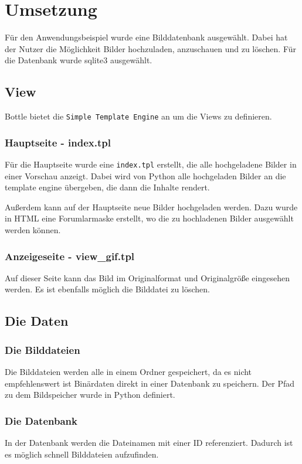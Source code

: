\section{Umsetzung}
Für den Anwendungsbeispiel wurde eine Bilddatenbank ausgewählt. Dabei hat der Nutzer die Möglichkeit Bilder hochzuladen, anzuschauen und zu löschen. Für die Datenbank wurde sqlite3 ausgewählt.

\subsection{View}
Bottle bietet die \verb|Simple Template Engine| an um die Views zu definieren. 

\subsubsection{Hauptseite - index.tpl}
Für die Hauptseite wurde eine \verb|index.tpl| erstellt, die alle hochgeladene Bilder in einer Vorschau anzeigt. Dabei wird von Python alle hochgeladen Bilder an die template engine übergeben, die dann die Inhalte rendert.

Außerdem kann auf der Hauptseite neue Bilder hochgeladen werden. Dazu wurde in HTML eine Forumlarmaske erstellt, wo die zu hochladenen Bilder ausgewählt werden können.


\subsubsection{Anzeigeseite - view\_gif.tpl}
Auf dieser Seite kann das Bild im Originalformat und Originalgröße eingesehen werden. Es ist ebenfalls möglich die Bilddatei zu löschen.


\subsection{Die Daten}

\subsubsection{Die Bilddateien}
Die Bilddateien werden alle in einem Ordner gespeichert, da es nicht empfehlenswert ist Binärdaten direkt in einer Datenbank zu speichern. Der Pfad zu dem Bildspeicher wurde in Python definiert.

\subsubsection{Die Datenbank}
In der Datenbank werden die Dateinamen mit einer ID referenziert. Dadurch ist es möglich schnell Bilddateien aufzufinden. 

